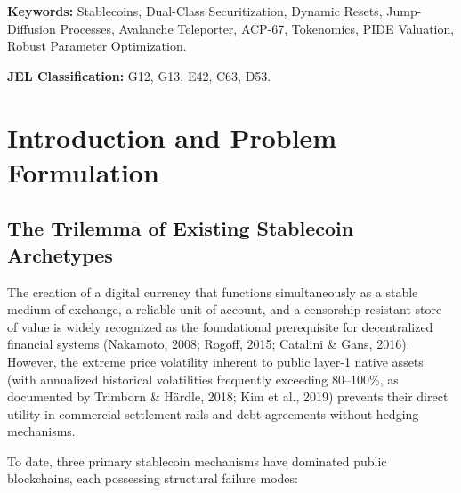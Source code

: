 \documentclass[11pt,a4paper]{article}
\begin{document}
\textbf{Keywords:} Stablecoins, Dual-Class Securitization, Dynamic Resets, Jump-Diffusion Processes, Avalanche Teleporter, ACP-67, Tokenomics, PIDE Valuation, Robust Parameter Optimization.

\textbf{JEL Classification:} G12, G13, E42, C63, D53.

\newpage
\tableofcontents
\newpage

\section{Introduction and Problem Formulation}

\subsection{The Trilemma of Existing Stablecoin Archetypes}
The creation of a digital currency that functions simultaneously as a stable medium of exchange, a reliable unit of account, and a censorship-resistant store of value is widely recognized as the foundational prerequisite for decentralized financial systems (Nakamoto, 2008; Rogoff, 2015; Catalini \& Gans, 2016). However, the extreme price volatility inherent to public layer-1 native assets (with annualized historical volatilities frequently exceeding 80--100\%, as documented by Trimborn \& H\"ardle, 2018; Kim et al., 2019) prevents their direct utility in commercial settlement rails and debt agreements without hedging mechanisms.

To date, three primary stablecoin mechanisms have dominated public blockchains, each possessing structural failure modes:
\end{document}
